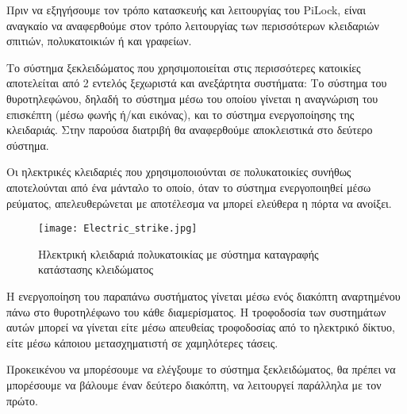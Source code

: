 Πριν να εξηγήσουμε τον τρόπο κατασκευής και λειτουργίας του PiLock, είναι αναγκαίο να αναφερθούμε στον τρόπο λειτουργίας των περισσότερων κλειδαριών σπιτιών, πολυκατοικιών ή και γραφείων.

Το σύστημα ξεκλειδώματος που χρησιμοποιείται στις περισσότερες κατοικίες αποτελείται από 2 εντελός ξεχωριστά και ανεξάρτητα συστήματα: Το σύστημα του θυροτηλεφώνου, δηλαδή το σύστημα μέσω του οποίου γίνεται η αναγνώριση του επισκέπτη (μέσω φωνής ή/και εικόνας), και το σύστημα ενεργοποίησης της κλειδαριάς. Στην παρούσα διατριβή θα αναφερθούμε αποκλειστικά στο δεύτερο σύστημα.

Οι ηλεκτρικές κλειδαριές που χρησιμοποιούνται σε πολυκατοικίες συνήθως αποτελούνται από ένα μάνταλο το οποίο, όταν το σύστημα ενεργοποιηθεί μέσω ρεύματος, απελευθερώνεται με αποτέλεσμα να μπορεί ελεύθερα η πόρτα να ανοίξει.

\begin{figure}[h]
	\centering
		\texttt{[image: Electric\_strike.jpg]}
	\caption{Ηλεκτρική κλειδαριά πολυκατοικίας με σύστημα καταγραφής κατάστασης κλειδώματος}
\end{figure}

Η ενεργοποίηση του παραπάνω συστήματος γίνεται μέσω ενός διακόπτη αναρτημένου πάνω στο θυροτηλέφωνο του κάθε διαμερίσματος. Η τροφοδοσία των συστημάτων αυτών μπορεί να γίνεται είτε μέσω απευθείας τροφοδοσίας από το ηλεκτρικό δίκτυο, είτε μέσω κάποιου μετασχηματιστή σε χαμηλότερες τάσεις.

Προκεικένου να μπορέσουμε να ελέγξουμε το σύστημα ξεκλειδώματος, θα πρέπει να μπορέσουμε να βάλουμε έναν δεύτερο διακόπτη, να λειτουργεί παράλληλα με τον πρώτο. %